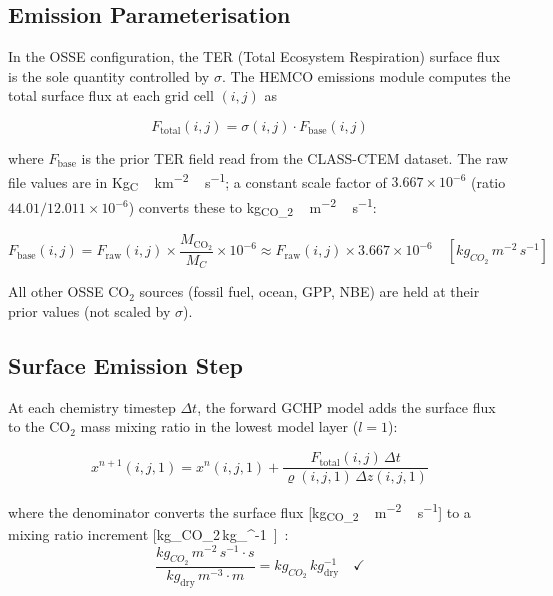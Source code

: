 \documentclass[12pt]{article}
\begin{document}
\subsection{Emission Parameterisation}

In the OSSE configuration, the TER (Total Ecosystem Respiration) surface flux
is the sole quantity controlled by $\sigma$. The HEMCO emissions module computes
the total surface flux at each grid cell $(i,j)$ as

\begin{equation}
  F_{\mathrm{total}}(i,j) = \sigma(i,j) \cdot F_{\mathrm{base}}(i,j)
  \label{eq:emission}
\end{equation}

where $F_{\mathrm{base}}$ is the prior TER field read from the CLASS-CTEM
dataset. The raw file values are in \si{Kg_C\,km^{-2}\,s^{-1}}; a constant
scale factor of $3.667 \times 10^{-6}$ (ratio $44.01/12.011 \times 10^{-6}$)
converts these to \si{kg_{CO_2}\,m^{-2}\,s^{-1}}:

\begin{equation}
  F_{\mathrm{base}}(i,j) = F_{\mathrm{raw}}(i,j) \times \frac{M_{\mathrm{CO}_2}}{M_C}
  \times 10^{-6}
  \approx F_{\mathrm{raw}}(i,j) \times 3.667 \times 10^{-6}
  \quad [\si{kg_{CO_2}\,m^{-2}\,s^{-1}}]
\end{equation}

All other OSSE CO$_2$ sources (fossil fuel, ocean, GPP, NBE) are held at their
prior values (not scaled by $\sigma$).

\subsection{Surface Emission Step}

At each chemistry timestep $\Delta t$, the forward GCHP model adds the surface
flux to the CO$_2$ mass mixing ratio in the lowest model layer ($l = 1$):

\begin{equation}
  x^{n+1}(i,j,1) = x^n(i,j,1)
    + \frac{F_{\mathrm{total}}(i,j)\,\Delta t}{\varrho(i,j,1)\,\Delta z(i,j,1)}
  \label{eq:forward_emission}
\end{equation}

where the denominator converts the surface flux
[\si{kg_{CO_2}\,m^{-2}\,s^{-1}}] to a mixing ratio increment
[\si{kg_{CO_2}\,kg_{}^{-1}}]:

\begin{equation}
  \frac{\si{kg_{CO_2}\,m^{-2}\,s^{-1}} \cdot \si{s}}
       {\si{kg_{\mathrm{dry}}\,m^{-3}} \cdot \si{m}}
  = \si{kg_{CO_2}\,kg_{\mathrm{dry}}^{-1}} \quad \checkmark
\end{equation}
\end{document}
